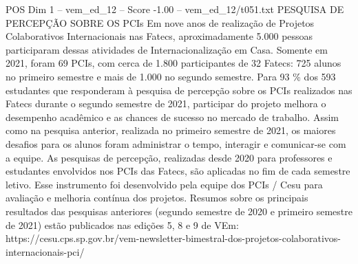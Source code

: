 \begin{textsample}{POS Dim 1 – vem\_ed\_12 – Score -1.00 – vem\_ed\_12/t051.txt}  \label{ex:f1_pos_082}
PESQUISA DE PERCEPÇÃO SOBRE OS PCIs Em nove anos de realização de Projetos Colaborativos Internacionais nas Fatecs, aproximadamente 5.000 pessoas participaram dessas atividades de Internacionalização em Casa.
Somente em 2021, foram 69 PCIs, com cerca de 1.800 participantes de 32 Fatecs: 725 alunos no primeiro semestre e mais de 1.000 no segundo semestre.
Para 93 \% dos 593 estudantes que responderam à pesquisa de percepção sobre os PCIs realizados nas Fatecs durante o segundo semestre de 2021, participar do projeto melhora o desempenho acadêmico e as chances de sucesso no mercado de trabalho.
Assim como na pesquisa anterior, realizada no primeiro semestre de 2021, os maiores desafios para os alunos foram administrar o tempo, interagir e comunicar-se com a equipe.
As pesquisas de percepção, realizadas desde 2020 para professores e estudantes envolvidos nos PCIs das Fatecs, são aplicadas no fim de cada semestre letivo.
Esse instrumento foi desenvolvido pela equipe dos PCIs / Cesu para avaliação e melhoria contínua dos projetos.
Resumos sobre os principais resultados das pesquisas anteriores (segundo semestre de 2020 e primeiro semestre de 2021) estão publicados nas edições 5, 8 e 9 de VEm: https://cesu.cps.sp.gov.br/vem-newsletter-bimestral-dos-projetos-colaborativos-internacionais-pci/

\end{textsample}
